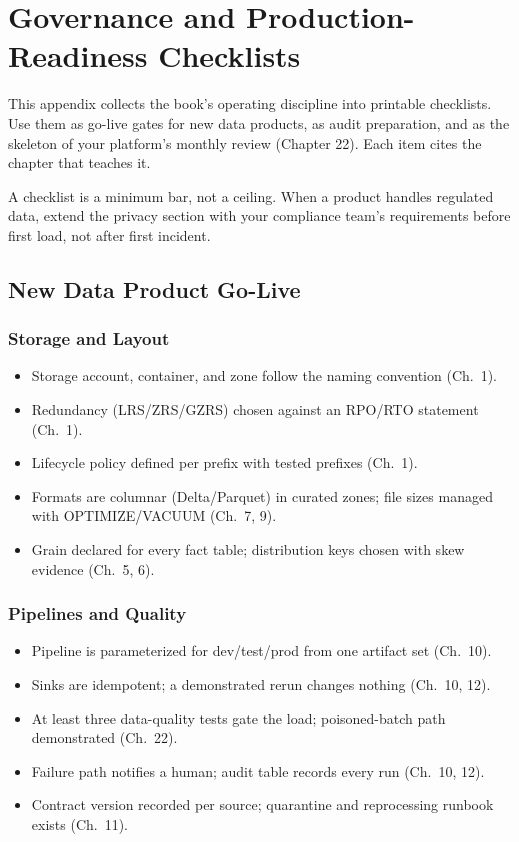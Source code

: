 \chapter{Governance and Production-Readiness Checklists}
%
This appendix collects the book's operating discipline into printable checklists.
Use them as go-live gates for new data products, as audit preparation, and as the
skeleton of your platform's monthly review (Chapter 22). Each item cites the
chapter that teaches it.

\begin{notebox}
A checklist is a minimum bar, not a ceiling. When a product handles regulated
data, extend the privacy section with your compliance team's requirements before
first load, not after first incident.
\end{notebox}

\section{New Data Product Go-Live}

\subsection*{Storage and Layout}
\begin{itemize}
    \item[$\square$] Storage account, container, and zone follow the naming convention (Ch.~1).
    \item[$\square$] Redundancy (LRS/ZRS/GZRS) chosen against an RPO/RTO statement (Ch.~1).
    \item[$\square$] Lifecycle policy defined per prefix with tested prefixes (Ch.~1).
    \item[$\square$] Formats are columnar (Delta/Parquet) in curated zones; file sizes managed with OPTIMIZE/VACUUM (Ch.~7, 9).
    \item[$\square$] Grain declared for every fact table; distribution keys chosen with skew evidence (Ch.~5, 6).
\end{itemize}

\subsection*{Pipelines and Quality}
\begin{itemize}
    \item[$\square$] Pipeline is parameterized for dev/test/prod from one artifact set (Ch.~10).
    \item[$\square$] Sinks are idempotent; a demonstrated rerun changes nothing (Ch.~10, 12).
    \item[$\square$] At least three data-quality tests gate the load; poisoned-batch path demonstrated (Ch.~22).
    \item[$\square$] Failure path notifies a human; audit table records every run (Ch.~10, 12).
    \item[$\square$] Contract version recorded per source; quarantine and reprocessing runbook exists (Ch.~11).
\end{itemize}

